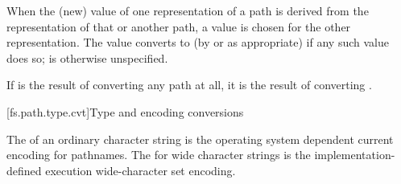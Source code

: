\pnum
When the (new) value  of one representation of a path
is derived from the representation of that or another path,
a value  is chosen for the other representation.
The value  converts to 
(by  or  as appropriate)
if any such value does so;
 is otherwise unspecified.
\begin{note}
If  is the result of converting any path at all,
it is the result of converting .
\end{note}


[fs.path.type.cvt]{Type and encoding conversions}

\pnum
The  of an ordinary character string is
the operating system dependent current encoding
for pathnames.
The  for wide character strings is
the implementation-defined execution
wide-character set encoding.

